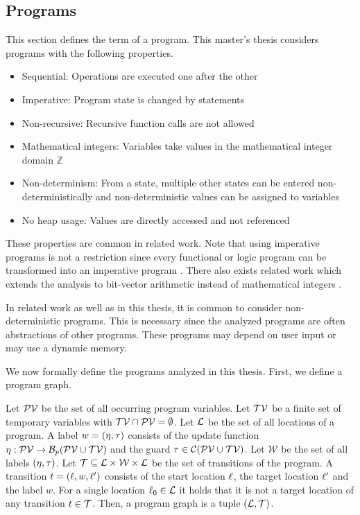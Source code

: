 \subsection{Programs}

This section defines the term of a program.
This master's thesis considers programs with the following properties.

\begin{itemize}
\item Sequential: Operations are executed one after the other
\item Imperative: Program state is changed by statements
\item Non-recursive: Recursive function calls are not allowed
\item Mathematical integers: Variables take values in the mathematical integer domain $\mathbb{Z}$
\item Non-determinism: From a state, multiple other states can be entered non-deterministically and non-deterministic values can be assigned to variables
\item No heap usage: Values are directly accessed and not referenced
\end{itemize}

These properties are common in related work.
Note that using imperative programs is not a restriction since every functional or logic program can be transformed into an imperative program \cite{equivalence_of_languages}.
There also exists related work which extends the analysis to bit-vector arithmetic instead of mathematical integers \cite{bitvectorarithmetic}.

In related work as well as in this thesis, it is common to consider non-deterministic programs.
This is necessary since the analyzed programs are often abstractions of other programs.
These programs may depend on user input or may use a dynamic memory.

We now formally define the programs analyzed in this thesis.
First, we define a program graph.

\begin{definition} 
  Let $\mathcal{PV}$ be the set of all occurring program variables.
  Let $\mathcal{TV}$ be a finite set of temporary variables with $\mathcal{TV} \cap \mathcal{PV} = \emptyset$.
  Let $\mathcal{L}$ be the set of all locations of a program.
  A label $w = (\eta, \tau)$ consists of the update function $\eta: \mathcal{PV} \rightarrow \mathcal{B}_p(\mathcal{PV} \cup \mathcal{TV})$ and the guard $\tau \in \mathcal{C}(\mathcal{PV} \cup \mathcal{TV})$.
  Let $\mathcal{W}$ be the set of all labels $(\eta, \tau)$.
  Let $\mathcal{T} \subseteq \mathcal{L} \times \mathcal{W} \times \mathcal{L}$ be the set of transitions of the program.
  A transition $t = (\ell, w, \ell')$ consists of the start location $\ell$, the target location $\ell'$ and the label $w$.
  For a single location $\ell_0 \in \mathcal{L}$ it holds that it is not a target location of any transition $t \in \mathcal{T}$.
  Then, a program graph is a tuple $(\mathcal{L}, \mathcal{T})$.
\end{definition}

